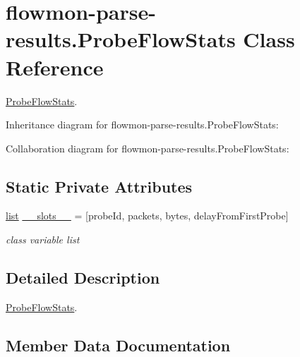\hypertarget{classflowmon-parse-results_1_1ProbeFlowStats}{}\section{flowmon-\/parse-\/results.Probe\+Flow\+Stats Class Reference}
\label{classflowmon-parse-results_1_1ProbeFlowStats}


\hyperlink{classflowmon-parse-results_1_1ProbeFlowStats}{Probe\+Flow\+Stats}.  




Inheritance diagram for flowmon-\/parse-\/results.Probe\+Flow\+Stats\+:


Collaboration diagram for flowmon-\/parse-\/results.Probe\+Flow\+Stats\+:
\subsection*{Static Private Attributes}
\begin{DoxyCompactItemize}
\item 
\hyperlink{openflow-interface_8h_afd9bcfa176617760671b67580f536fa7}{list} \hyperlink{classflowmon-parse-results_1_1ProbeFlowStats_a14e908486c3e1a8bb897432e42b0670b}{\+\_\+\+\_\+slots\+\_\+\+\_\+} = \mbox{[}\textquotesingle{}probe\+Id\textquotesingle{}, \textquotesingle{}packets\textquotesingle{}, \textquotesingle{}bytes\textquotesingle{}, \textquotesingle{}delay\+From\+First\+Probe\textquotesingle{}\mbox{]}
\begin{DoxyCompactList}\small\item\em class variable list \end{DoxyCompactList}\end{DoxyCompactItemize}


\subsection{Detailed Description}
\hyperlink{classflowmon-parse-results_1_1ProbeFlowStats}{Probe\+Flow\+Stats}. 

\subsection{Member Data Documentation}
